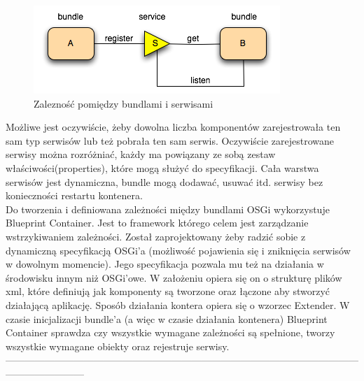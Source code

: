 \begin{figure}[!h]
	\centering
	\includegraphics[scale=0.75]{serveLayer.png} 
	\caption{Zalezność pomiędzy bundlami i serwisami}
\end{figure}
 Możliwe jest oczywiście, żeby dowolna liczba komponentów zarejestrowała ten sam typ serwisów lub też pobrała ten sam serwis. Oczywiście zarejestrowane serwisy można rozróżniać, każdy ma powiązany ze sobą zestaw właściwości(properties), które mogą służyć do specyfikacji. Cała warstwa serwisów jest dynamiczna, bundle mogą dodawać, usuwać itd. serwisy bez konieczności restartu kontenera.  \\
Do tworzenia i definiowana zależności między bundlami OSGi wykorzystuje Blueprint Container. Jest to framework którego celem jest zarządzanie wstrzykiwaniem zależności. Został zaprojektowany żeby radzić sobie z dynamiczną specyfikacją OSGi'a (możliwość pojawienia się i zniknięcia serwisów w dowolnym momencie). Jego specyfikacja pozwala mu też na działania w środowisku innym niż OSGi'owe. W założeniu opiera się on o strukturę plików xml, które definiują jak komponenty są tworzone oraz łączone aby stworzyć działającą aplikację. Sposób działania kontera opiera się o wzorzec Extender. W czasie inicjalizacji bundle'a (a więc w czasie działania kontenera) Blueprint Container sprawdza czy wszystkie wymagane zależności są spełnione, tworzy wszystkie wymagane obiekty oraz rejestruje serwisy. 
\\------------------------------------------------------------------------------------------------------------------------------------

